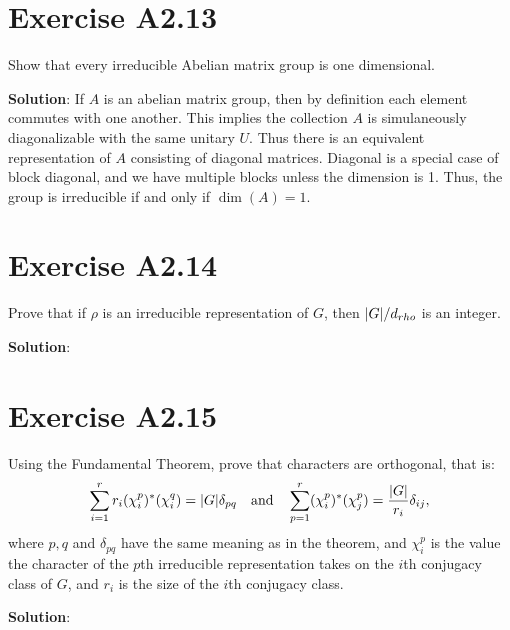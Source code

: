\documentclass{book}
\begin{document}
\section*{Exercise A2.13}
    Show that every irreducible Abelian matrix group is one dimensional.
    
    \textbf{Solution}: If $A$ is an abelian matrix group, then by definition each element commutes with one another. This implies the collection $A$ is simulaneously diagonalizable with the same unitary $U$. Thus there is an equivalent representation of $A$ consisting of diagonal matrices. Diagonal is a special case of block diagonal, and we have multiple blocks unless the dimension is 1. Thus, the group is irreducible if and only if $\dim(A) = 1$.

\section*{Exercise A2.14}
    Prove that if $\rho$ is an irreducible representation of $G$, then $\abs{G}/d_{rho}$ is an integer.
    
    \textbf{Solution}:

\section*{Exercise A2.15}
    Using the Fundamental Theorem, prove that characters are orthogonal, that is:
    \begin{align}
        \sum_{i=1}^r r_i(\chi_i^p)^*(\chi_i^q) = \abs{G}\delta_{pq} \quad \text{and} \quad \sum_{p=1}^r (\chi_i^p)^*(\chi_j^p) = \frac{\abs{G}}{r_i} \delta_{ij},
    \end{align}
    where $p, q$ and $\delta_{pq}$ have the same meaning as in the theorem, and $\chi_i^p$ is the value the character of the $p$th irreducible representation takes on the $i$th conjugacy class of $G$, and $r_i$ is the size of the $i$th conjugacy class.
    
    \textbf{Solution}:
\end{document}
